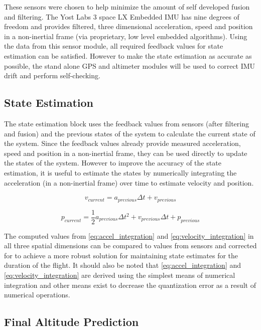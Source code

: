 \documentclass[conference, letterpaper]{IEEEtran}
\begin{document}
These sensors were chosen to help minimize the amount of self developed fusion and
filtering. The Yost Labs 3 space LX Embedded IMU has nine degrees of freedom and
provides filtered, three dimensional acceleration, speed and position in a
non-inertial frame (via proprietary, low level embedded algorithms)\citep{yost}. Using the data
from this sensor module, all required feedback values for state estimation can be
satisfied. However to make the state estimation as accurate as possible, the
stand alone GPS and altimeter modules will be used to correct IMU drift and
perform self-checking.

\subsection{State Estimation}

The state estimation block uses the feedback values from sensors (after filtering and fusion)
and the previous states of the system to calculate the current state of the system.
Since the feedback values already provide measured acceleration, speed and position
in a non-inertial frame, they can be used directly to update the states of the system. However
to improve the accuracy of the state estimation, it is useful to estimate the states by numerically
integrating the acceleration (in a non-inertial frame) over time to estimate velocity and position.

\begin{equation}\label{eq:accel_integration}
  v_{current} = a_{previous}\Delta t + v_{previous}
\end{equation}

\begin{equation}\label{eq:velocity_integration}
  p_{current} = \frac{1}{2}a_{previous}\Delta t^2 + v_{previous}\Delta t + p_{previous}
\end{equation}

The computed values from \ref{eq:accel_integration} and \ref{eq:velocity_integration} in all three spatial dimensions can
be compared to values from sensors and corrected for to achieve a more robust solution for
maintaining state estimates for the duration of the flight. It should also be noted that
\ref{eq:accel_integration} and \ref{eq:velocity_integration} are derived using the
simplest means of numerical integration and other means exist to decrease the quantization
error as a result of numerical operations.

\subsection{Final Altitude Prediction}
\end{document}
